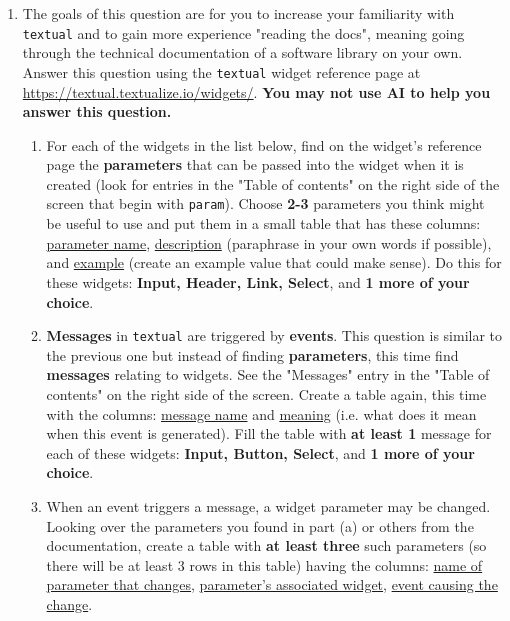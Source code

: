 \documentclass[12pt]{article}
\begin{document}
\begin{enumerate}
	\item The goals of this question are for you to increase your familiarity with \texttt{textual} and to gain more experience "reading the docs", meaning going through the technical documentation of a software library on your own. Answer this question using the \texttt{textual} widget reference page at  			\href{https://textual.textualize.io/widgets/}{https://textual.textualize.io/widgets/}. \textbf{You may not use AI to help you answer this question.}  
	\begin{enumerate}
		\item For each of the widgets in the list below, find on the widget's reference page the \textbf{parameters} that can be passed into the widget when it is created (look for entries in the "Table of contents" on the right side of the screen that begin with \texttt{param}).  Choose \textbf{2-3} parameters you think might be useful to use and put them in a small table that has these columns: \underline{parameter name}, \underline{description} (paraphrase in your own words if possible), and \underline{example} (create an example value that could make sense). Do this for these widgets: \textbf{Input, Header, Link, Select}, and \textbf{1 more of your choice}.
		\item \textbf{Messages} in \texttt{textual} are triggered by \textbf{events}. This question is similar to the previous one but instead of finding \textbf{parameters}, this time find \textbf{messages} relating to widgets. See the "Messages" entry in the "Table of contents" on the right side of the screen. Create a table again, this time with the columns: \underline{message name} and \underline{meaning} (i.e. what does it mean when this event is generated). Fill the table with \textbf{at least 1 }message for each of these widgets: \textbf{Input, Button, Select}, and \textbf{1 more of your choice}.
		\item When an event triggers a message, a widget parameter may be changed. Looking over the parameters you found in part (a) or others from the documentation, create a table with \textbf{at least three} such parameters (so there will be at least 3 rows in this table) having the columns: \underline{name of parameter that changes}, \underline{parameter's associated widget}, \underline{event causing the change}. 
	\end{enumerate}


\end{enumerate}
\end{document}
